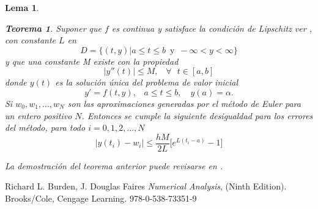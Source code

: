 \documentclass[a4paper]{article}
\newtheorem{theorem}{Teorema}
\newtheorem{lemma}{Lema}
\begin{document}
\begin{lemma}
\begin{theorem}
Suponer que $f$ es continua y satisface la condición de Lipschitz ver \cite{Burden}, con constante $L$ en 
\begin{equation*}
D=\{(t,y)|a\leq t \leq b \,\,\, \text{y}\,\,\, -\infty<y<\infty \}
\end{equation*}
y que una constante M existe con la propiedad
\begin{equation*}
|y''(t)|\leq M, \,\,\,\,\, \forall \,\,\,\, t\in [a,b]
\end{equation*}
donde $y(t)$ es la solución única del problema de valor inicial
\begin{equation*}
y'=f(t,y), \,\,\,\,\, a \leq t \leq b, \,\,\,\,\,\, y(a)=\alpha.
\end{equation*}
Si $w_0,w_1, \hdots, w_N$ son las aproximaciones generadas por el método de Euler para un entero positivo $N$. Entonces se cumple la siguiente desigualdad para los errores del método, para todo $i=0,1,2,\hdots,N$
\begin{equation}
|y(t_i)-w_i|\leq \frac{hM}{2L}\big[ e^{L(t_i -a)}-1 \big]
\end{equation}
\end{theorem}
La demostración del teorema anterior puede revisarse en \cite{Burden}.
\end{lemma}


\begin{thebibliography}{99}


 Richard L. Burden, J. Douglas Faires \textit{Numerical Analysis}, (Ninth Edition). Brooks/Cole, Cengage Learning. 978-0-538-73351-9






\end{thebibliography}
\end{document}
